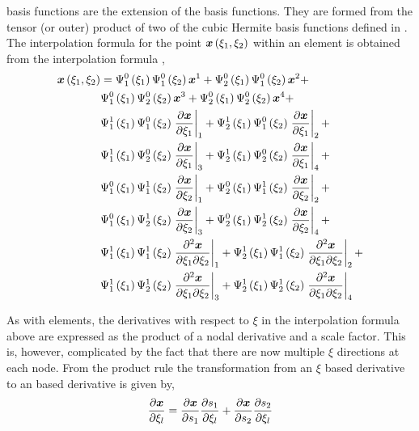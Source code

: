 \Bicubicherm basis functions are the \twodal extension of the \onedal
\cubicherm basis functions. They are formed from the tensor (or outer) product
of two of the \onedal cubic Hermite basis functions defined in
.  The interpolation formula for the point
$\fnof{\vect{x}}{\xione,\xitwo}$ within an element is obtained from the
\bicubicherm interpolation formula \cite{nielsen:1991a}, 
\begin{equation}
  \begin{split}
    \fnof{\vect{x}}{\xione,\xitwo} &=
    \chbfn{1}{0}{\xione}\chbfn{1}{0}{\xitwo}\nodept{\vect{x}}{1} +
    \chbfn{2}{0}{\xione}\chbfn{1}{0}{\xitwo}\nodept{\vect{x}}{2} + \\
    & \chbfn{1}{0}{\xione}\chbfn{2}{0}{\xitwo}\nodept{\vect{x}}{3} +
    \chbfn{2}{0}{\xione}\chbfn{2}{0}{\xitwo}\nodept{\vect{x}}{4} + \\
    & \chbfn{1}{1}{\xione}\chbfn{1}{0}{\xitwo}\evalat{\delby{\vect{x}}{\xione}}
    {1}+
    \chbfn{2}{1}{\xione}\chbfn{1}{0}{\xitwo}\evalat{\delby{\vect{x}}{\xione}}
    {2}+ \\ 
    & \chbfn{1}{1}{\xione}\chbfn{2}{0}{\xitwo}\evalat{\delby{\vect{x}}{\xione}}
    {3}+
    \chbfn{2}{1}{\xione}\chbfn{2}{0}{\xitwo}\evalat{\delby{\vect{x}}{\xione}}
    {4} + \\ 
    & \chbfn{1}{0}{\xione}\chbfn{1}{1}{\xitwo}\evalat{\delby{\vect{x}}{\xitwo}}
    {1}+
    \chbfn{2}{0}{\xione}\chbfn{1}{1}{\xitwo}\evalat{\delby{\vect{x}}{\xitwo}}
    {2} + \\ 
    & \chbfn{1}{0}{\xione}\chbfn{2}{1}{\xitwo}\evalat{\delby{\vect{x}}{\xitwo}}
    {3}+
    \chbfn{2}{0}{\xione}\chbfn{2}{1}{\xitwo}\evalat{\delby{\vect{x}}{\xitwo}}
    {4} + \\ 
    & \chbfn{1}{1}{\xione}\chbfn{1}{1}{\xitwo}\evalat{\deltwoby{\vect{x}}
      {\xione}{\xitwo}}{1} +
    \chbfn{2}{1}{\xione}\chbfn{1}{1}{\xitwo}\evalat{\deltwoby{\vect{x}}
      {\xione}{\xitwo}}{2} + \\
    & \chbfn{1}{1}{\xione}\chbfn{2}{1}{\xitwo}\evalat{\deltwoby{\vect{x}}
      {\xione}{\xitwo}}{3} + 
    \chbfn{2}{1}{\xione}\chbfn{2}{1}{\xitwo}\evalat{ \deltwoby{\vect{x}}
      {\xione}{\xitwo}}{4}    
  \end{split}
  \label{eqn:bichxiinterp}
\end{equation}

As with \onedal \cubicherm elements, the derivatives with respect to $\xi$ in
the \twodal interpolation formula above are expressed as the product of a
nodal \arclen derivative and a scale factor. This is, however, complicated by
the fact that there are now multiple $\xi$ directions at each node. From the
product rule the transformation from an $\xi$ based derivative to an \arclen
based derivative is given by,
\begin{equation}
  \delby{\vect{x}}{\xi_{l}}=\delby{\vect{x}}{s_{1}}\delby{s_{1}}{\xi_{l}}+
  \delby{\vect{x}}{s_{2}}\delby{s_{2}}{\xi_{l}}
  \label{eqn:xitosproductrule}
\end{equation}

